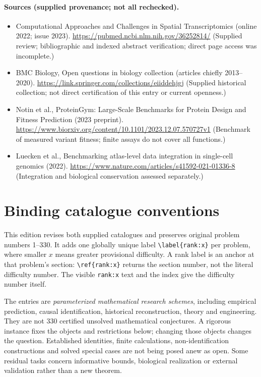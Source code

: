 \documentclass[11pt]{article}
\begin{document}
\paragraph{Sources (supplied provenance; not all rechecked).}
\begin{itemize}
\item Computational Approaches and Challenges in Spatial Transcriptomics (online 2022; issue 2023). \url{https://pubmed.ncbi.nlm.nih.gov/36252814/} (Supplied review; bibliographic and indexed abstract verification; direct page access was incomplete.)
\item BMC Biology, Open questions in biology collection (articles chiefly 2013--2020). \url{https://link.springer.com/collections/eiiddehjgj} (Supplied historical collection; not direct certification of this entry or current openness.)
\item Notin et al., ProteinGym: Large-Scale Benchmarks for Protein Design and Fitness Prediction (2023 preprint). \url{https://www.biorxiv.org/content/10.1101/2023.12.07.570727v1} (Benchmark of measured variant fitness; finite assays do not cover all functions.)
\item Luecken et al., Benchmarking atlas-level data integration in single-cell genomics (2022). \url{https://www.nature.com/articles/s41592-021-01336-8} (Integration and biological conservation assessed separately.)
\end{itemize}


\section*{Binding catalogue conventions}
This edition revises both supplied catalogues and preserves original problem numbers 1--330. It adds one globally unique label \verb|\label{rank:x}| per problem, where smaller $x$ means greater provisional difficulty. A rank label is an anchor at that problem's section: \verb|\ref{rank:x}| returns the section number, not the literal difficulty number. The visible \texttt{rank:x} text and the index give the difficulty number itself.

The entries are \emph{parameterized mathematical research schemes}, including empirical prediction, causal identification, historical reconstruction, theory and engineering. They are not 330 certified unsolved mathematical conjectures. A rigorous instance fixes the objects and restrictions below; changing those objects changes the question. Established identities, finite calculations, non-identification constructions and solved special cases are not being posed anew as open. Some residual tasks concern informative bounds, biological realization or external validation rather than a new theorem.
\end{document}
